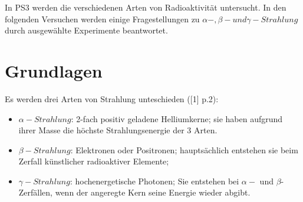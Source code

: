 \documentclass[12pt,a4paper]{article}
\begin{document}
\begin{multicols}{2}




%			




\noindent In PS3 werden die verschiedenen Arten von Radioaktivität untersucht. In den folgenden Versuchen werden einige Fragestellungen zu $\alpha-, \beta- und \gamma-Strahlung$ durch ausgewählte Experimente beantwortet.

\section{Grundlagen}
Es werden drei Arten von Strahlung unteschieden ([1] p.2):
\begin{itemize}
	\item $\alpha-Strahlung$: 2-fach positiv geladene Helliumkerne; sie haben aufgrund ihrer Masse die höchste Strahlungsenergie der 3 Arten.
	\item $\beta-Strahlung$: Elektronen oder Positronen; hauptsächlich entstehen sie beim Zerfall künstlicher radioaktiver Elemente;
	\item $\gamma-Strahlung$: hochenergetische Photonen; Sie entstehen bei $\alpha-$ und $\beta$-Zerfällen, wenn der angeregte Kern seine Energie wieder abgibt.
\end{itemize}


\end{multicols}
\end{document}
